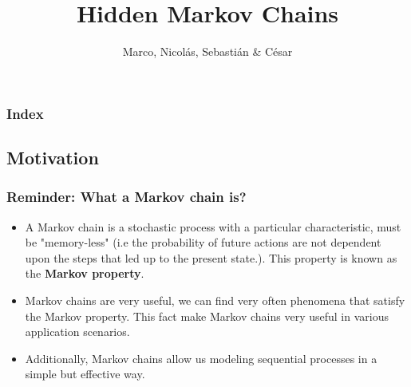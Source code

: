 \documentclass[xcolor=dvipsnames, compress]{beamer}
\title[Hidden Markov Chains]{Hidden Markov Chains}
\author{Marco, Nicolás, Sebastián \& César}
\institute[ITAM]
\begin{document}
%
\begin{frame}
\titlepage
\end{frame}

\begin{frame}
\frametitle{Index}
 \tableofcontents%
\end{frame}


\begin{frame}
\section{Motivation }
\frametitle{Reminder: What a Markov chain is?}
\begin{itemize}	
	\item A Markov chain is a stochastic process with a particular characteristic, must be "memory-less" (i.e the probability of future actions are not dependent upon the steps that led up to the present state.). This property is known as the \textbf{Markov property}.
	\item Markov chains are very useful, we can find very often phenomena that satisfy the Markov property. This fact make Markov chains very useful in various application scenarios.
	\item Additionally, Markov chains allow us modeling sequential processes in a simple but effective way.	
\end{itemize}
\end{frame}
\end{document}
